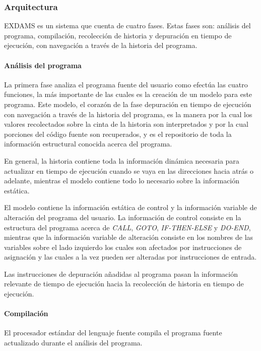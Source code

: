 \documentclass[12pt,legalpaper]{report}
\begin{document}
			\subsubsection{Arquitectura}

EXDAMS es un sistema que cuenta de cuatro fases.  Estas fases son: análisis del programa, compilación, recolección de historia y depuración en tiempo de ejecución, con navegación a través de la historia del programa.

				\paragraph{Análisis del programa}

La primera fase analiza el programa fuente del usuario como efectúa las cuatro funciones, la más importante de las cuales es la creación de un modelo para este programa.  Este modelo, el corazón de la fase depuración en tiempo de ejecución con navegación a través de la historia del programa, es la manera por la cual los valores recolectados sobre la cinta de la historia son interpretados y por la cual porciones del código fuente son recuperados, y es el repositorio de toda la información estructural conocida acerca del programa.

En general, la historia contiene toda la información dinámica necesaria para actualizar en tiempo de ejecución cuando se vaya en las direcciones hacia atrás o adelante, mientras el modelo contiene todo lo necesario sobre la información estática.

El modelo contiene la información estática de control y la información variable de alteración del programa del usuario.  La información de control consiste en la estructura del programa acerca de \textit{CALL}, \textit{GOTO}, \textit{IF-THEN-ELSE} y \textit{DO-END}, mientras que la información variable de alteración consiste en los nombres de las variables sobre el lado izquierdo los cuales son afectados por instrucciones de asignación y las cuales a la vez pueden ser alteradas por instrucciones de entrada.

Las instrucciones de depuración añadidas al programa pasan la información relevante de tiempo de ejecución hacia  la recolección de historia en tiempo de ejecución.

				\paragraph{Compilación}

El procesador estándar del lenguaje fuente compila el programa fuente actualizado durante el análisis del programa.
\end{document}
